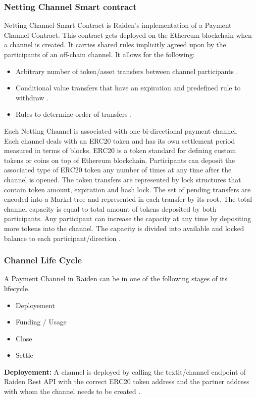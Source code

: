 \subsubsection{Netting Channel Smart contract} \label{NCSC}	
Netting Channel Smart Contract is Raiden’s implementation of a Payment Channel Contract. This contract gets deployed on the Ethereum blockchain when a channel is created. It carries shared rules implicitly agreed upon by the participants of an off-chain channel. It allows for the following: \cite{rad:001}
\begin{itemize}

\item Arbitrary number of token/asset transfers between channel participants \cite{rad:001}.
\item Conditional value transfers that have an expiration and predefined rule to withdraw \cite{rad:001}.
\item Rules to determine order of transfers \cite{rad:001}.

\end{itemize}
Each Netting Channel is associated with one bi-directional payment channel. Each channel deals with an ERC20 token and has its own settlement period measured in terms of blocks. ERC20 is a token standard for defining custom tokens or coins on top of Ethereum blockchain. Participants can deposit the associated type of ERC20 token any number of times at any time after the channel is opened. The token transfers are represented by lock structures that contain token amount, expiration and hash lock. The set of pending transfers are encoded into a Markel tree and represented in each transfer by its root. The total channel capacity is equal to total amount of tokens deposited by both participants. Any participant can increase the capacity at any time by depositing more tokens into the channel. The capacity is divided into available and locked balance to each participant/direction \cite{rad:001}.
\clearpage
\subsubsection{Channel Life Cycle} \label{CLC}	
A Payment Channel in Raiden can be in one of the following stages of its lifecycle.
\begin{itemize}

\item Deployement
\item Funding / Usage
\item Close
\item Settle
\end{itemize}
\textbf{Deployement:} A channel is deployed by calling the textit{/channel} endpoint of Raiden Rest API with the correct ERC20 token address and the partner address with whom the channel needs to be created \cite{rad:001}.

